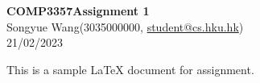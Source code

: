 \documentclass[11pt]{article}
\makeatletter
\def\assignmentnum{1}
\def\coursecode{COMP3357}
\def\studentname{Songyue Wang}
\def\UID{3035000000}
\def\authoremail{student@cs.hku.hk}
\def\date{21/02/2023} %
\makeatother
\begin{document}
\thispagestyle{empty}

\begin{center}
{\LARGE \bf \coursecode \space Assignment \assignmentnum}\\
{\large \studentname \space (\UID, \href{mailto:\authoremail}{\authoremail})}\\ 
{\large \date}\\
\end{center}

This is a sample LaTeX document for assignment.
\end{document}
